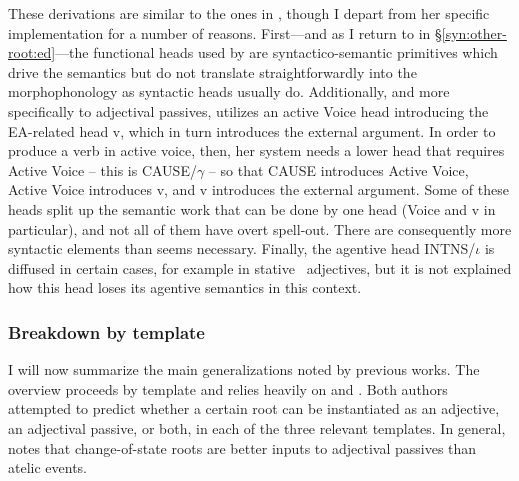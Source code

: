 These derivations are similar to the ones in \cite{doron14adj}, though I depart from her specific implementation for a number of reasons. First---and as I return to in \S\ref{syn:other-root:ed}---the functional heads used by \citeauthor{doron14adj} are syntactico-semantic primitives which drive the semantics but do not translate straightforwardly into the morphophonology as syntactic heads usually do. Additionally, and more specifically to adjectival passives, \citeauthor{doron14adj} utilizes an active Voice head introducing the EA-related head v, which in turn introduces the external argument. In order to produce a verb in active voice, then, her system needs a lower head that requires Active Voice -- this is CAUSE/$\gamma$ -- so that CAUSE introduces Active Voice, Active Voice introduces v, and v introduces the external argument. Some of these heads split up the semantic work that can be done by one head (Voice and v in particular), and not all of them have overt spell-out. There are consequently more syntactic elements than seems necessary. Finally, the agentive head INTNS/$\iota$ is diffused in certain cases, for example in stative \mpua~adjectives, but it is not explained how this head loses its agentive semantics in this context.




    \subsubsection{Breakdown by template}
I will now summarize the main generalizations noted by previous works. The overview proceeds by template and relies heavily on \cite{doron00,doron14adj} and \cite{meltzerasscher11}. Both authors attempted to predict whether a certain root can be instantiated as an adjective, an adjectival passive, or both, in each of the three relevant templates. In general, \cite{doron00} notes that change-of-state roots are better inputs to adjectival passives than atelic events.

